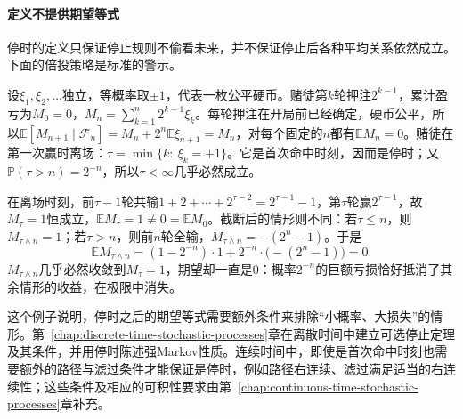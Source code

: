 \paragraph{定义不提供期望等式}
停时的定义只保证停止规则不偷看未来，并不保证停止后各种平均关系依然成立。下面的倍投策略是标准的警示。

\begin{example}[倍投策略]
\label{ex:spp-doubling}
设$\xi_1,\xi_2,\ldots$独立，等概率取$\pm1$，代表一枚公平硬币。赌徒第$k$轮押注$2^{k-1}$，累计盈亏为$M_0=0$，$M_n=\sum_{k=1}^n2^{k-1}\xi_k$。每轮押注在开局前已经确定，硬币公平，所以$\mathbb E[M_{n+1}\mid\mathcal F_n]=M_n+2^n\mathbb E\xi_{n+1}=M_n$，对每个固定的$n$都有$\mathbb EM_n=0$。赌徒在第一次赢时离场：$\tau=\min\{k:\ \xi_k=+1\}$。它是首次命中时刻，因而是停时；又$\mathbb P(\tau>n)=2^{-n}$，所以$\tau<\infty$几乎必然成立。

在离场时刻，前$\tau-1$轮共输$1+2+\cdots+2^{\tau-2}=2^{\tau-1}-1$，第$\tau$轮赢$2^{\tau-1}$，故$M_\tau=1$恒成立，$\mathbb EM_\tau=1\ne0=\mathbb EM_0$。截断后的情形则不同：若$\tau\le n$，则$M_{\tau\wedge n}=1$；若$\tau>n$，则前$n$轮全输，$M_{\tau\wedge n}=-(2^n-1)$。于是
\[
  \mathbb EM_{\tau\wedge n}=(1-2^{-n})\cdot1+2^{-n}\cdot\bigl(-(2^n-1)\bigr)=0 .
\]
$M_{\tau\wedge n}$几乎必然收敛到$M_\tau=1$，期望却一直是$0$：概率$2^{-n}$的巨额亏损恰好抵消了其余情形的收益，在极限中消失。
\end{example}

这个例子说明，停时之后的期望等式需要额外条件来排除“小概率、大损失”的情形。第~\ref{chap:discrete-time-stochastic-processes}章在离散时间中建立可选停止定理及其条件，并用停时陈述强Markov性质。连续时间中，即使是首次命中时刻也需要额外的路径与滤过条件才能保证是停时，例如路径右连续、滤过满足适当的右连续性；这些条件及相应的可积性要求由第~\ref{chap:continuous-time-stochastic-processes}章补充。
